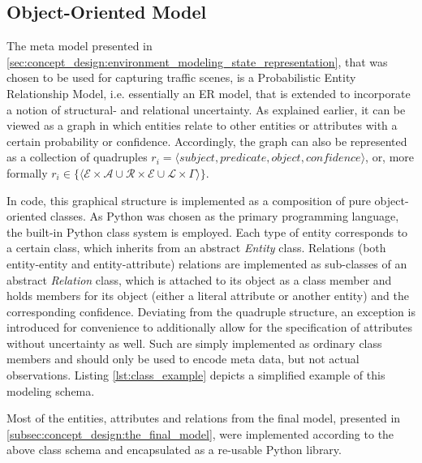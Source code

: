 \subsection{Object-Oriented Model}
\label{subsec:implementation:object_oriented_model}
The meta model presented in \cref{sec:concept_design:environment_modeling_state_representation}, that was chosen to be used for capturing traffic scenes, is a Probabilistic Entity Relationship Model, i.e. essentially an ER model, that is extended to incorporate a notion of structural- and relational uncertainty. As explained earlier, it can be viewed as a graph in which entities relate to other entities or attributes with a certain probability or confidence. Accordingly, the graph can also be represented as a collection of quadruples $r_i = \langle \textit{subject}, \textit{predicate}, \textit{object}, \textit{confidence} \rangle$, or, more formally $r_i \in \{ \langle \mathcal{E} \times \mathcal{A} \cup \mathcal{R} \times \mathcal{E} \cup \mathcal{L} \times \Gamma \rangle \}$. 

In code, this graphical structure is implemented as a composition of pure object-oriented classes. As Python was chosen as the primary programming language, the built-in Python class system is employed. Each type of entity corresponds to a certain class, which inherits from an abstract \textit{Entity} class. Relations (both entity-entity and entity-attribute) relations are implemented as sub-classes of an abstract \textit{Relation} class, which is attached to its object as a class member and holds members for its object (either a literal attribute or another entity) and the corresponding confidence. Deviating from the quadruple structure, an exception is introduced for convenience to additionally allow for the specification of attributes without uncertainty as well. Such are simply implemented as ordinary class members and should only be used to encode meta data, but not actual observations. Listing \ref{lst:class_example} depicts a simplified example of this modeling schema.

Most of the entities, attributes and relations from the final model, presented in \cref{subsec:concept_design:the_final_model}, were implemented according to the above class schema and encapsulated as a re-usable Python library.

\begin{samepage}
\inputminted[fontsize=\footnotesize]{python}{97_listings/class_example.py}
\label{lst:class_example}
\end{samepage}

